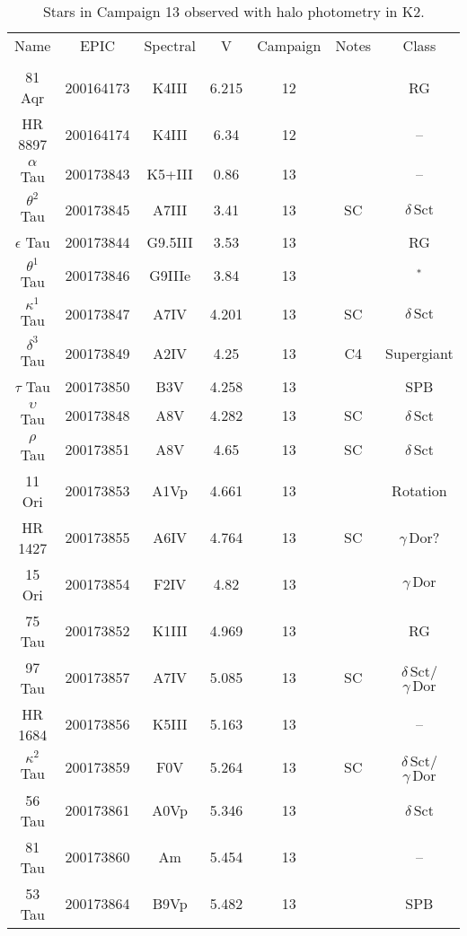 \begin{table*}
\caption{Stars in Campaign 13 observed with halo photometry in K2.\label{table_3}}
\begin{tabular}{ccccccc}
\hline \hline
Name & EPIC & Spectral & V & Campaign & Notes & Class \\
 &  &  &  &  &  &  \\
\hline
81 Aqr & 200164173 & K4III & 6.215 & 12 &  & RG \\
HR 8897 & 200164174 & K4III & 6.34 & 12 &  & -- \\
$\alpha$ Tau & 200173843 & K5+III & 0.86 & 13 & \tablenotemark{c} & -- \\
$\theta^{2}$ Tau & 200173845 & A7III & 3.41 & 13 & SC & $\delta\,\text{Sct}$ \\
$\epsilon$ Tau & 200173844 & G9.5III & 3.53 & 13 & \tablenotemark{d} & RG \\
$\theta^{1}$ Tau & 200173846 & G9IIIe & 3.84 & 13 &  & $^*$ \\
$\kappa^{1}$ Tau & 200173847 & A7IV & 4.201 & 13 & SC & $\delta\,\text{Sct}$ \\
$\delta^{3}$ Tau & 200173849 & A2IV & 4.25 & 13 & C4 & Supergiant \\
$\tau$ Tau & 200173850 & B3V & 4.258 & 13 &  & SPB \\
$\upsilon$ Tau & 200173848 & A8V & 4.282 & 13 & SC & $\delta\,\text{Sct}$ \\
$\rho$ Tau & 200173851 & A8V & 4.65 & 13 & SC & $\delta\,\text{Sct}$ \\
11 Ori & 200173853 & A1Vp & 4.661 & 13 &  & Rotation \\
HR 1427 & 200173855 & A6IV & 4.764 & 13 & SC & $\gamma\,\text{Dor}$? \\
15 Ori & 200173854 & F2IV & 4.82 & 13 &  & $\gamma\,\text{Dor}$ \\
75 Tau & 200173852 & K1III & 4.969 & 13 &  & RG \\
97 Tau & 200173857 & A7IV & 5.085 & 13 & SC & $\delta\,\text{Sct}$/$\gamma\,\text{Dor}$ \\
HR 1684 & 200173856 & K5III & 5.163 & 13 &  & -- \\
$\kappa^{2}$ Tau & 200173859 & F0V & 5.264 & 13 & SC & $\delta\,\text{Sct}$/$\gamma\,\text{Dor}$ \\
56 Tau & 200173861 & A0Vp & 5.346 & 13 &  & $\delta\,\text{Sct}$ \\
81 Tau & 200173860 & Am & 5.454 & 13 &  & -- \\
53 Tau & 200173864 & B9Vp & 5.482 & 13 &  & SPB \\

\end{tabular}
\end{table*}
